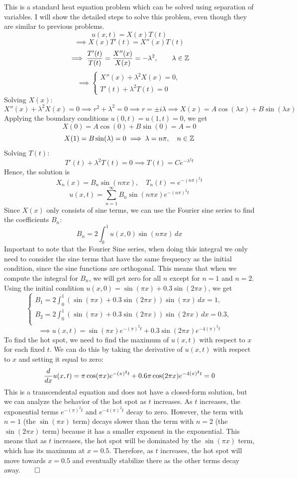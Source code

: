 \documentclass[12pt]{article}
\begin{document}
\sol
This is a standard heat equation problem which can be solved using separation of variables. I will show the detailed steps to solve this problem, even though they are similar to previous problems.
\[
u(x,t) = X(x)T(t)
\]
\[
\implies X(x)T'(t) = X''(x)T(t)
\]
\[
\implies \frac{T'(t)}{T(t)} = \frac{X''(x)}{X(x)} = -\lambda^2, \qquad \lambda \in \mathbb{Z}
\]
\[
\implies 
\begin{cases}
X''(x) + \lambda^2 X(x) = 0, \\
T'(t) + \lambda^2 T(t) = 0
\end{cases}
\]
Solving $X(x)$:
\[
X''(x) + \lambda^2 X(x) = 0
\implies r^2 + \lambda^2 = 0
\implies r = \pm i\lambda
\implies X(x) = A\cos(\lambda x) + B\sin(\lambda x)
\]
Applying the boundary conditions $u(0,t) = u(1,t) = 0$, we get
\[
X(0) = A \cos(0) + B \sin(0) = A = 0
\]
\[
X(1) = B \sin(\lambda) = 0 \implies \lambda = n\pi, \quad n \in \mathbb{Z}
\]
Solving $T(t)$:
\[
T'(t) + \lambda^2 T(t) = 0
\implies T(t) = Ce^{-\lambda^2 t}
\]
Hence, the solution is
\[
X_n(x) = B_n \sin(n\pi x), \quad T_n(t) = e^{-(n\pi)^2 t}
\]
\[
u(x,t) = \sum_{n=1}^{\infty} B_n \sin(n\pi x) e^{-(n\pi)^2 t}
\]
Since $X(x)$ only consists of sine terms, we can use the Fourier sine series to find the coefficients $B_n$:
\[
B_n = 2 \int_0^1 u(x,0) \sin(n\pi x)\, dx
\]
Important to note that the Fourier Sine series, when doing this integral we only need to consider the sine terms that have the same frequency as the initial condition, since the sine functions are orthogonal. This means that when we compute the integral for $B_n$, we will get zero for all $n$ except for $n=1$ and $n=2$.
Using the initial condition $u(x,0) = \sin(\pi x) + 0.3\sin(2\pi x)$, we get
\[
\begin{cases}
B_1 = 2 \int_0^1 (\sin(\pi x) + 0.3\sin(2\pi x)) \sin(\pi x)\, dx = 1, \\
B_2 = 2 \int_0^1 (\sin(\pi x) + 0.3\sin(2\pi x)) \sin(2\pi x)\, dx = 0.3, \\
\end{cases}
\]
\[
\implies 
\boxed{
u(x,t) = \sin(\pi x) e^{-(\pi)^2 t} + 0.3\sin(2\pi x) e^{-4(\pi)^2 t}
}
\]
To find the hot spot, we need to find the maximum of $u(x,t)$ with respect to $x$ for each fixed $t$. We can do this by taking the derivative of $u(x,t)$ with respect to $x$ and setting it equal to zero:
\[
\frac{d}{dx} u(x,t) = \pi \cos(\pi x) e^{-(\pi)^2 t} + 0.6\pi \cos(2\pi x) e^{-4(\pi)^2 t} = 0
\]
This is a transcendental equation and does not have a closed-form solution, but we can analyze the behavior of the hot spot as $t$ increases. As $t$ increases, the exponential terms $e^{-(\pi)^2 t}$ and $e^{-4(\pi)^2 t}$ decay to zero. However, the term with $n=1$ (the $\sin(\pi x)$ term) decays slower than the term with $n=2$ (the $\sin(2\pi x)$ term) because it has a smaller exponent in the exponential. This means that as $t$ increases, the hot spot will be dominated by the $\sin(\pi x)$ term, which has its maximum at $x = 0.5$. Therefore, as $t$ increases, the hot spot will move towards $x = 0.5$ and eventually stabilize there as the other terms decay away.$\qed$
\end{document}

